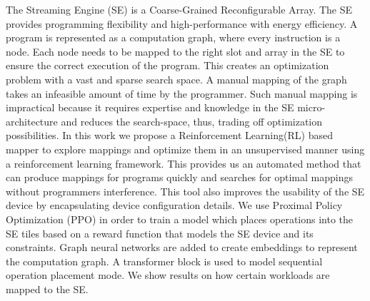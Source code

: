 The Streaming Engine (SE) is a Coarse-Grained Reconfigurable Array. %
The SE provides programming flexibility and high-performance with energy efficiency.
A program is represented as a computation graph, where every instruction is a node.
Each node needs to be mapped to the right slot and array in the SE to ensure the correct execution of the program.
This creates an optimization problem with a vast and sparse search space.
A manual mapping of the graph takes an infeasible amount of time by the programmer.
Such manual mapping is impractical because it requires expertise and knowledge in the SE micro-architecture and reduces the search-space, thus, trading off optimization possibilities.
In this work we propose a Reinforcement Learning(RL) based mapper to explore mappings and optimize them in an unsupervised manner using a reinforcement learning framework.
This provides us an automated method that can produce mappings for programs quickly and searches for optimal mappings without programmers interference. 
This tool also improves the usability of the SE device by encapsulating device configuration details.
We use Proximal Policy Optimization (PPO) in order to train a model which places operations into the SE tiles based on a reward function that models the SE device and its constraints.
Graph neural networks are added to create embeddings to represent the computation graph.
A transformer block is used to model sequential operation placement mode. 
We show results on how certain workloads are mapped to the SE.
